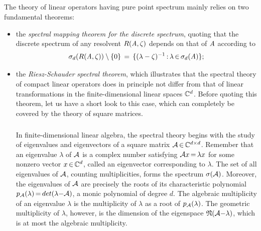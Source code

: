 \documentclass[11pt,twoside]{article}
\begin{document}
\subsection{} %
The theory of linear operators having pure point spectrum
mainly relies on two fundamental theorems:

\begin{itemize}[leftmargin=12pt]
\item[1.]
the \textit{spectral mapping theorem for the discrete spectrum},
quoting that
the discrete spectrum of any resolvent $R(\mathit{A},\zeta)$ depends
on that of $\mathit{A}$ according to
\[
\sigma_d(R(\mathit{A},\zeta)) \setminus \{0\} \,=\,
\{(\lambda-\zeta)^{-1} {\,:\,} \lambda {\,\in\,} \sigma_d(\mathit{A})\};
\]

\item[2.]
the \textit{Riesz-Schauder} \textit{spectral theorem},
which illustrates
that the spectral theory of compact linear operators does in principle
not differ from that of linear transformations
in the finite-dimensional linear spaces ${\mathbb{C}}^d$.
Before quoting this theorem,
let us have a short look to this case,
which can completely be covered by the theory of square matrices.

\subparagraph{} %
In finite-dimensional linear algebra,
the spectral theory begins with the study of eigenvalues and eigenvectors
of a square matrix ${\mathcal{A}} {\,\in\,} {\mathbb{C}}^{d \times d}$.
Remember that an eigenvalue $\lambda$ of ${\mathcal{A}}$ is a complex number
satisfying ${\mathcal{A}} x {\,=\,} \lambda x$ for some nonzero vector $x {\,\in\,} {\mathbb{C}}^d$,
called an eigenvector corresponding to $\lambda$.
The set of all eigenvalues of ${\mathcal{A}}$, counting multiplicities,
forms the spectrum $\sigma({\mathcal{A}})$.
Moreover,
the eigenvalues of ${\mathcal{A}}$ are precisely the roots
of its characteristic polynomial $p_{{\mathcal{A}}}(\lambda) {\,=\,} det(\lambda {-} {\mathcal{A}})$,
a monic polynomial of degree $d$.
The algebraic multiplicity of an eigenvalue $\lambda$ is
the multiplicity of $\lambda$ as a root of $p_{{\mathcal{A}}}(\lambda)$.
The geometric multiplicity of $\lambda$,
however,
is the dimension of the eigenspace $\mathfrak{N}({\mathcal{A}} {-} \lambda)$,
which is at most the algebraic multiplicity.


\end{itemize}
\end{document}
